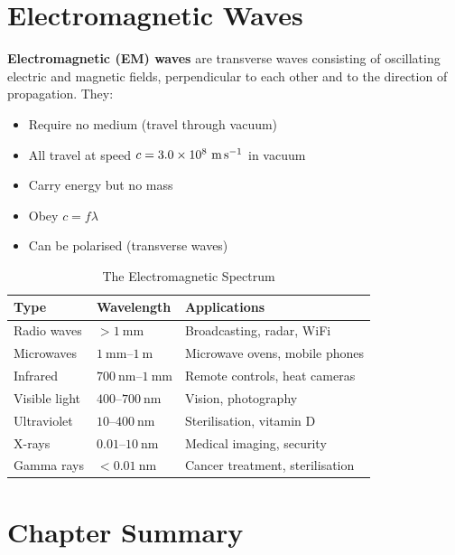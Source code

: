 \section{Electromagnetic Waves}

\begin{definitionbox}
\textbf{Electromagnetic (EM) waves} are transverse
waves consisting of oscillating electric and magnetic
fields, perpendicular to each other and to the
direction of propagation. They:
\begin{itemize}[noitemsep]
  \item Require no medium (travel through vacuum)
  \item All travel at speed $c = 3.0\times10^8\ \text{m\,s}^{-1}$
  in vacuum
  \item Carry energy but no mass
  \item Obey $c = f\lambda$
  \item Can be polarised (transverse waves)
\end{itemize}
\end{definitionbox}

\begin{table}[H]
\centering
\caption{The Electromagnetic Spectrum}
\label{tab:em_spectrum}
\begin{tabular}{lll}
\toprule
\textbf{Type} & \textbf{Wavelength} & \textbf{Applications}\\
\midrule
Radio waves & $>1\ \text{mm}$ &
  Broadcasting, radar, WiFi\\
Microwaves & $1\ \text{mm}$--$1\ \text{m}$ &
  Microwave ovens, mobile phones\\
Infrared & $700\ \text{nm}$--$1\ \text{mm}$ &
  Remote controls, heat cameras\\
Visible light & $400$--$700\ \text{nm}$ &
  Vision, photography\\
Ultraviolet & $10$--$400\ \text{nm}$ &
  Sterilisation, vitamin D\\
X-rays & $0.01$--$10\ \text{nm}$ &
  Medical imaging, security\\
Gamma rays & $<0.01\ \text{nm}$ &
  Cancer treatment, sterilisation\\
\bottomrule
\end{tabular}
\end{table}

\section{Chapter Summary}

